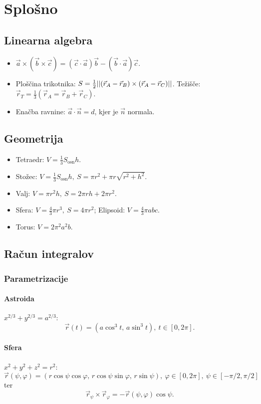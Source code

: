 \section{Splošno}
\subsection{Linearna algebra}
\begin{itemize}
    \item \(\vec{a} \times (\vec{b} \times \vec{c}) = (\vec{c} \cdot \vec{a}) \vec{b} - (\vec{b} \cdot \vec{a}) \vec{c}\).
    \item Ploščina trikotnika: \(S = \frac{1}{2} ||(\vec{r}_A - \vec{r}_B) \times (\vec{r}_A - \vec{r}_C)||\). Težišče: \(\vec{r}_T = \frac{1}{3}(\vec{r}_A = \vec{r}_B + \vec{r}_C)\).
    \item Enačba ravnine: \(\vec{a} \cdot \vec{n} = d\), kjer je \(\vec{n}\) normala.
\end{itemize}

\subsection{Geometrija}
\begin{itemize}
    \item Tetraedr: \(V = \frac{1}{3}S_\text{osn} h\).
    \item Stožec: \(V = \frac{1}{3}S_\text{osn} h, \ S = \pi r^2 + \pi r \sqrt{r^2+h^2}\).
    \item Valj: \(V = \pi r^2 h, \ S = 2\pi rh+2\pi r^2\).
    \item Sfera: \(V = \frac{4}{3} \pi r^3, \ S = 4 \pi r^2\); Elipsoid: \(V = \frac{4}{3} \pi abc\).
    \item Torus: \(V = 2\pi^2 a^2 b\).
\end{itemize}
\subsection{Račun integralov}
\subsubsection{Parametrizacije}
\paragraph{Astroida} \(x^{2/3} + y^{2/3} = a^{2/3}\):
\[
    \vec{r}(t) = (a \cos^3 t,\, a \sin^3 t), \ t \in [0, 2\pi].
\]
\paragraph{Sfera} \(x^2 + y^2 + z^2 = r^2\):
\[
    \vec{r}(\psi, \varphi) = (r\cos \psi \cos \varphi,\, r\cos \psi \sin \varphi,\, r\sin\psi), \ \varphi \in [0, 2\pi], \ \psi \in [- \pi/2, \pi/2]
\]
ter 
\[
    \vec{r}_\psi \times \vec{r}_\varphi = - \vec{r}(\psi, \varphi) \cos\psi.
\]

